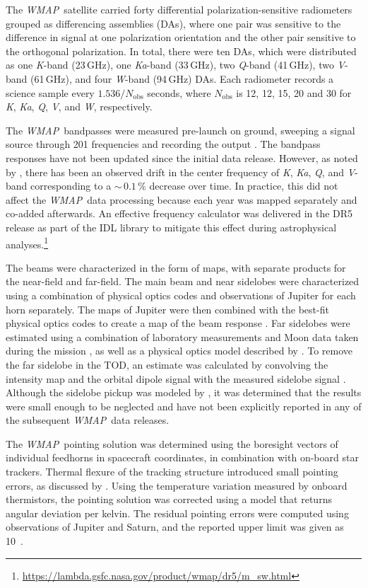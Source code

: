 \documentclass[twocolumn]{../../common/aa}
\def\WMAP{\emph{WMAP}}
\newcommand{\K}[0]{\textit K}
\newcommand{\Ka}[0]{\textit{Ka}}
\newcommand{\Q}[0]{\textit Q}
\newcommand{\V}[0]{\textit V}
\newcommand{\W}[0]{\textit W}
\begin{document}
The \WMAP\ satellite carried forty differential polarization-sensitive
radiometers grouped as differencing assemblies (DAs), where one pair
was sensitive to the difference in signal at one polarization
orientation and the other pair sensitive to the orthogonal
polarization. In total, there were ten DAs, which were distributed as
one \K-band (23\,GHz), one \Ka-band (33\,GHz), two \Q-band (41\,GHz),
two \V-band (61\,GHz), and four \W-band (94\,GHz) DAs. Each radiometer records a science sample every $1.536/N_\mathrm{obs}$ seconds, where $N_\mathrm{obs}$ is 12, 12, 15, 20 and 30 for \K, \Ka, \Q, \V, and \W, respectively.

The \WMAP\ bandpasses were measured pre-launch on ground, sweeping a signal source through 201 frequencies and recording the output \citep{jarosik2003:MAP}. The bandpass responses have not been updated since the initial data release. However, as noted by \citet{bennett2012}, there has been an observed drift in the center frequency of \K, \Ka, \Q, and \V-band corresponding to a $\sim$$\,0.1\,\%$ decrease over time. In practice, this did not affect the \WMAP\ data processing because each year was mapped separately and co-added afterwards. An effective frequency calculator was delivered in the DR5 release as part of the IDL library to mitigate this effect during astrophysical analyses.\footnote{\url{https://lambda.gsfc.nasa.gov/product/wmap/dr5/m_sw.html}}

The beams were characterized in the form of maps, with separate products for the near-field and far-field. The main beam and near sidelobes were characterized using a combination of physical optics codes and observations of Jupiter for each horn separately. The maps of Jupiter were then combined with the best-fit physical optics codes to create a map of the beam response \citep{hill2009,weiland2010,bennett2012}.
Far sidelobes were estimated using a combination of laboratory measurements and Moon data taken during the mission \citep{barnes2003}, as well as a physical optics model described by \citet{hinshaw2009}. To remove the far sidelobe  in the TOD, an estimate was calculated by convolving the intensity map and the orbital dipole signal with the measured sidelobe signal \citep{jarosik2007}. Although the sidelobe pickup was modeled by \citet{barnes2003}, it was determined that the results were small enough to be neglected and have not been explicitly reported in any of the subsequent \WMAP\ data releases.

The \WMAP\ pointing solution was determined using the boresight vectors of individual feedhorns in spacecraft coordinates, in combination with on-board star trackers. Thermal flexure of the tracking structure introduced small pointing errors, as discussed by \citet{jarosik2007}. Using the temperature variation measured by onboard thermistors, the pointing solution was corrected using a model that returns angular deviation per kelvin. The residual pointing errors were computed using observations of Jupiter and Saturn, and the reported upper limit was given as 10\arcsec\ \citep{bennett2012,wmapexsupp}.
\end{document}
